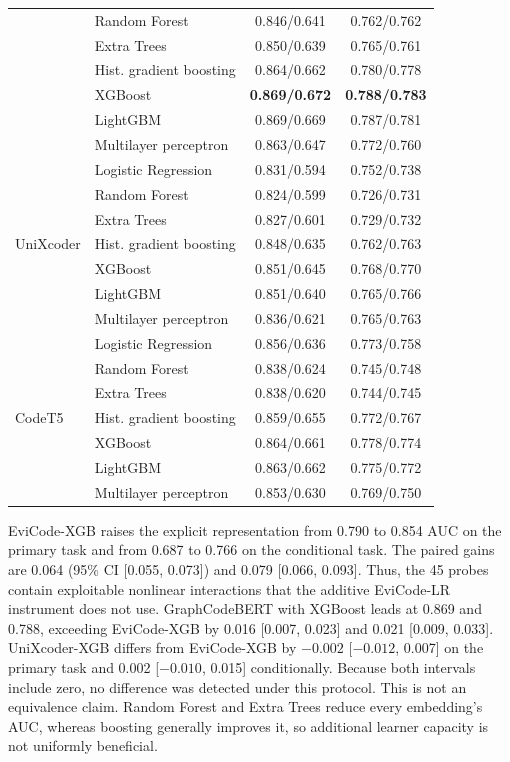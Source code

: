 \documentclass[conference]{IEEEtran}
\begin{document}
\begin{table}[!t]
\begin{tabular}{@{}llcc@{}}
 & Random Forest & 0.846/0.641 & 0.762/0.762 \\
 & Extra Trees & 0.850/0.639 & 0.765/0.761 \\
 & Hist. gradient boosting & 0.864/0.662 & 0.780/0.778 \\
 & XGBoost & \textbf{0.869/0.672} & \textbf{0.788/0.783} \\
 & LightGBM & 0.869/0.669 & 0.787/0.781 \\
 & Multilayer perceptron & 0.863/0.647 & 0.772/0.760 \\
\midrule
\multirow{7}{*}{UniXcoder}
 & Logistic Regression & 0.831/0.594 & 0.752/0.738 \\
 & Random Forest & 0.824/0.599 & 0.726/0.731 \\
 & Extra Trees & 0.827/0.601 & 0.729/0.732 \\
 & Hist. gradient boosting & 0.848/0.635 & 0.762/0.763 \\
 & XGBoost & 0.851/0.645 & 0.768/0.770 \\
 & LightGBM & 0.851/0.640 & 0.765/0.766 \\
 & Multilayer perceptron & 0.836/0.621 & 0.765/0.763 \\
\midrule
\multirow{7}{*}{CodeT5}
 & Logistic Regression & 0.856/0.636 & 0.773/0.758 \\
 & Random Forest & 0.838/0.624 & 0.745/0.748 \\
 & Extra Trees & 0.838/0.620 & 0.744/0.745 \\
 & Hist. gradient boosting & 0.859/0.655 & 0.772/0.767 \\
 & XGBoost & 0.864/0.661 & 0.778/0.774 \\
 & LightGBM & 0.863/0.662 & 0.775/0.772 \\
 & Multilayer perceptron & 0.853/0.630 & 0.769/0.750 \\
\bottomrule
\end{tabular}
\end{table}

EviCode-XGB raises the explicit representation from 0.790 to 0.854 AUC on the primary task and from 0.687 to 0.766 on the conditional task. The paired gains are 0.064 (95\% CI [0.055, 0.073]) and 0.079 [0.066, 0.093]. Thus, the 45 probes contain exploitable nonlinear interactions that the additive EviCode-LR instrument does not use. GraphCodeBERT with XGBoost leads at 0.869 and 0.788, exceeding EviCode-XGB by 0.016 [0.007, 0.023] and 0.021 [0.009, 0.033]. UniXcoder-XGB differs from EviCode-XGB by $-0.002$ [${-0.012}$, 0.007] on the primary task and 0.002 [${-0.010}$, 0.015] conditionally. Because both intervals include zero, no difference was detected under this protocol. This is not an equivalence claim. Random Forest and Extra Trees reduce every embedding's AUC, whereas boosting generally improves it, so additional learner capacity is not uniformly beneficial.
\end{document}
